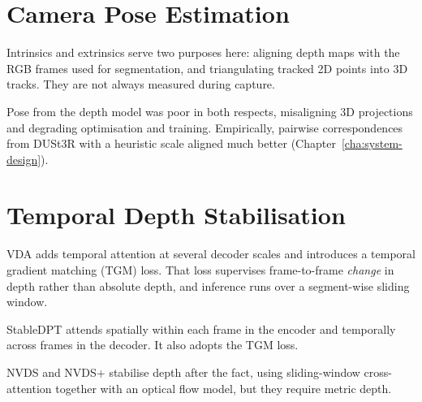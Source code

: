 \section{Camera Pose Estimation}
\label{sec:bg-pose}

Intrinsics and extrinsics serve two purposes here: aligning depth maps with the RGB frames used
for segmentation, and triangulating tracked 2D points into 3D tracks. They are not always
measured during capture.

Pose from the depth model was poor in both respects, misaligning 3D projections and degrading
optimisation and training. Empirically, pairwise correspondences from DUSt3R with a heuristic scale aligned
much better (Chapter~\ref{cha:system-design}).

\section{Temporal Depth Stabilisation}
\label{sec:bg-temporal}

VDA \parencite{vda} adds temporal attention at several decoder scales and introduces a temporal
gradient matching (TGM) loss. That loss supervises frame-to-frame \emph{change} in depth rather
than absolute depth, and inference runs over a segment-wise sliding window.

StableDPT \parencite{stabledpt} attends spatially within each frame in the encoder and
temporally across frames in the decoder. It also adopts the TGM loss.

NVDS and NVDS+ \parencite{nvds,nvdsp} stabilise depth after the fact, using sliding-window
cross-attention together with an optical flow model, but they require metric depth.

